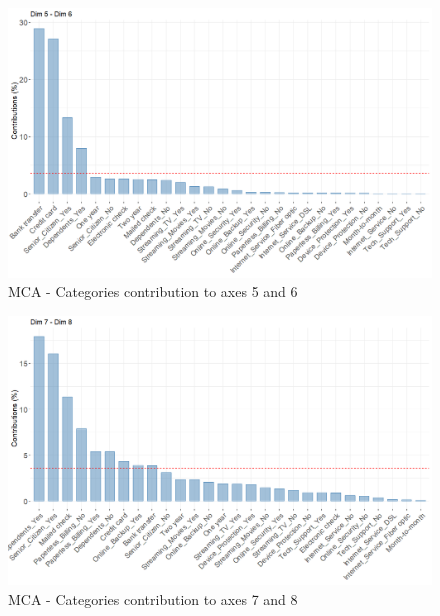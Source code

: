 \documentclass[
]{book}
\begin{document}
\begin{figure}

{\centering \includegraphics[width=15.28in]{./imgs/mca_contrib_56} 

}

\caption{MCA -  Categories contribution to axes 5 and 6}\label{fig:mcacontrib56}
\end{figure}

\begin{figure}

{\centering \includegraphics[width=15.28in]{./imgs/mca_contrib_78} 

}

\caption{MCA -  Categories contribution to axes 7 and 8}\label{fig:mcacontrib78}
\end{figure}
\end{document}
